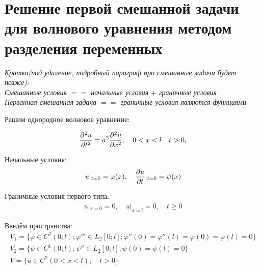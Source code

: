 \documentclass[../main.tex]{subfiles}
\begin{document}
\section{Решение первой смешанной задачи для волнового уравнения
    методом разделения переменных}
    \textit{Кратко(под удаление, подробный параграф про смешанные задачи будет позже):\\
    Смешанные условия $==$ начальные условия $+$ граничные условия\\
    Перванная смешанная задача $==$ граничные условия являются функциями\\}

    Решим однородное волновое уравнение:
    
    \begin{gather}
        \label{eq:2.8.1}
        \frac{\partial^2 u}{\partial t^2} = a^2 \frac{\partial^2 u}{\partial x^2}, \quad 0<x<l \quad t>0,
    \end{gather}
    
    Начальные условия: 
    \begin{gather}
        \label{eq:2.8.2}
        u|_{t=0}=\varphi(x), \quad \frac{\partial u}{\partial t}|_{t=0}=\psi(x)
    \end{gather}

    Граничные условия первого типа: 
    \begin{gather}
        \label{eq:2.8.3}
        u|_{x=0}=0,\quad u|_{x=l}=0, \quad t\geq 0
    \end{gather}

    Введём пространства:
    \begin{gather*}
        V_1=\{\varphi \in C^2(0;l); \varphi'''\in L_2[0;l];
                \varphi''(0) = \varphi''(l) = \varphi(0) = \varphi(l) = 0\}\\
        V_2=\{\psi \in C^1(0;l); \psi''\in L_2[0;l];
                \psi(0) = \psi(l) = 0\}\\
        V = \{u \in C^2(0<x<l);\quad t>0\}
    \end{gather*}
\end{document}
